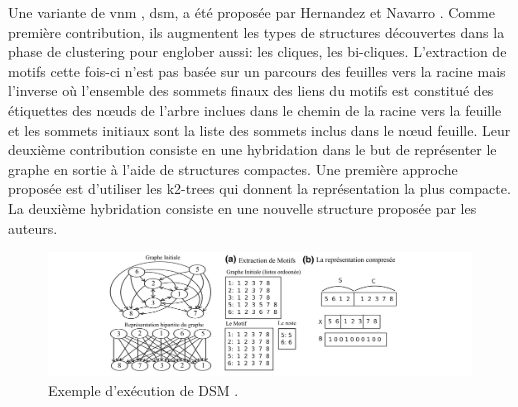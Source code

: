 \newpage	
	Une variante de \gls{vnm} , 
	\gls{dsm}, a été proposée par Hernandez et Navarro \citep{hernandez2014compressed}. Comme première contribution, ils augmentent les types de structures découvertes dans la phase de clustering pour englober aussi: les cliques, les bi-cliques. L'extraction de motifs cette fois-ci n'est pas basée sur un parcours des feuilles vers la racine mais l'inverse où  l'ensemble des sommets finaux des liens du motifs est constitué des étiquettes des nœuds de l'arbre inclues dans le chemin de la racine vers la feuille et  les sommets initiaux sont la liste des sommets inclus dans le nœud feuille. 
				Leur deuxième contribution consiste en une hybridation dans le but de représenter le graphe en sortie à l'aide de structures compactes. Une première approche proposée est d'utiliser les  k2-trees \citep{brisaboa2009k}  qui donnent la représentation la plus compacte.  
				La deuxième hybridation consiste en une nouvelle structure proposée par les auteurs.\\
				
				
				
				\begin{figure}[!h]
					\includegraphics[scale=0.23]{ressources/image/VNM2_exemple.png} 
					\caption{Exemple d'exécution de DSM \citep{hernandez2014compressed}.}
					\label{SDM}
				\end{figure}
			